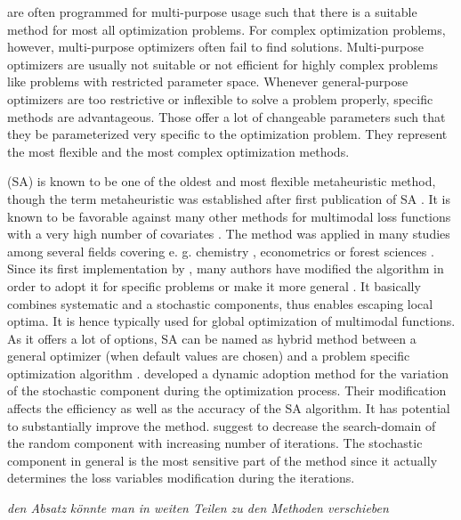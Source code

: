 are often programmed for multi-purpose usage such that there is a suitable method for most all optimization problems. For complex optimization problems, however, multi-purpose optimizers often fail to find solutions. Multi-purpose optimizers are usually not suitable or not efficient for highly complex problems like problems with restricted parameter space. Whenever general-purpose optimizers are too restrictive or inflexible to solve a problem properly, specific methods are advantageous. Those offer a lot of changeable parameters such that they be parameterized very specific to the optimization problem. They represent the most flexible and the most complex optimization methods\citep{blum_2003}.

 (SA) \citep{kirkpatrick_1983} is known to be one of the oldest and most flexible metaheuristic method, though the term metaheuristic was established after first publication of SA \citep{blum_2003}. It is known to be favorable against many other methods for multimodal loss functions with a very high number of covariates \citep{corana_1987}. The method was applied in many studies among several fields covering e. g. chemistry \citep{agostini_2006}, econometrics \citep{ingber_1993} or forest sciences \citep{baskent_2002}. Since its first implementation by \citet{kirkpatrick_1983}, many authors have modified the algorithm in order to adopt it for specific problems \citep[e. g.][]{desarbo_1989, goffe_1996} or make it more general \citep[e. g.][]{xiang_2013}. It basically combines systematic and a stochastic components, thus enables escaping local optima. It is hence typically used for global optimization of multimodal functions. As it offers a lot of options, SA can be named as hybrid method between a general optimizer (when default values are chosen) and a problem specific optimization algorithm \citep{wegener_2005}. \citet{corana_1987} developed a dynamic adoption method for the variation of the stochastic component during the optimization process. Their modification affects the efficiency as well as the accuracy of the SA algorithm. It has potential to substantially improve the method. \citet{pronzato_1984} suggest to decrease the search-domain of the random component with increasing number of iterations. The stochastic component in general is the most sensitive part of the method since it actually determines the loss variables modification during the iterations.

\textit{den Absatz könnte man in weiten Teilen zu den Methoden verschieben}

